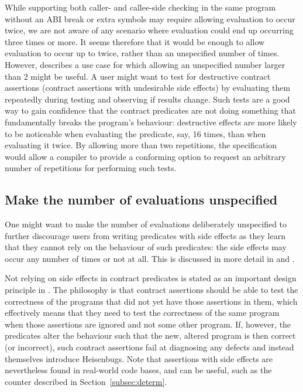 While supporting both caller- and callee-side checking in the same program without an ABI break or extra symbols may require allowing evaluation to occur twice, we are not aware of any scenario where evaluation could end up occurring three times or more. It seems therefore that it would be enough to allow evaluation to occur up to twice, rather than an unspecified number of times. However, \cite{P3119R0} describes a use case for which allowing an unspecified number larger than 2 might be useful. A user might want to test for destructive contract assertions (contract assertions with undesirable side effects) by evaluating them repeatedly during testing and observing if results change.  Such tests are a good way to gain confidence that the contract predicates are not doing something that fundamentally breaks the program's behaviour: destructive effects are more likely to be noticeable when evaluating the predicate, say, 16 times, than when evaluating it twice. By allowing more than two repetitions, the specification would allow a compiler to provide a conforming option to request an arbitrary number of repetitions for performing such tests.

\subsection{Make the number of evaluations unspecified}
\label{subsec:discourage}

One might want to make the number of evaluations deliberately unspecified to further discourage users from writing predicates with side effects as they learn that they cannot rely on the behaviour of such predicates: the side effects may occur any number of times or not at all. This is discussed in more detail in \cite{P1670R0} and \cite{P2751R1}.

Not relying on side effects in contract predicates is stated as an important design principle in \cite{P2900R6}. The philosophy is that contract assertions should be able to test the correctness of the programs that did not yet have those assertions in them, which effectively means that they need to test the correctness of the same program when those assertions are ignored and not some other program. If, however, the predicates alter the behaviour such that the new, altered program is then correct (or incorrect), such contract assertions fail at diagnosing any defects and instead themselves introduce Heisenbugs. Note that assertions with side effects are nevertheless found in real-world code bases, and can be useful, such as the counter described in Section~\ref{subsec:determ}.

